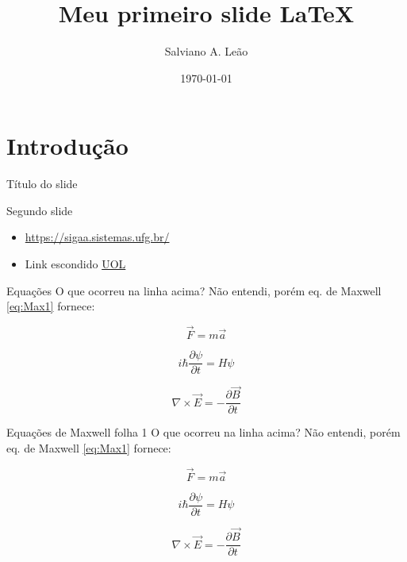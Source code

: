 \documentclass[style=sailor,clock,mode=present]{powerdot}
\title{Meu primeiro slide LaTeX}
\author{Salviano A. Leão}
\date{\today}
\begin{document}
\maketitle

\section{Introdução}

\begin{slide}{Título do slide}
\lipsum[1]
\end{slide}



\begin{slide}[toc=]{Segundo slide}
\begin{itemize}
   \item \url{https://sigaa.sistemas.ufg.br/}

   \item Link escondido \href{https://www.uol.com.br/}{UOL}
\end{itemize}

\end{slide}

\begin{slide}{Equações}
O que ocorreu na linha acima? Não entendi, porém 
eq. de Maxwell \ref{eq:Max1} fornece:

\begin{equation}\label{eq:2LN} 
 \vec{F} = m \vec{a}
\end{equation} 


\begin{equation}\label{eq:Sch} 
 i \hbar \frac{\partial \psi}{\partial t} = H \psi
\end{equation} 


\begin{equation}\label{eq:Max1} 
 \nabla \times \vec{E} = - \frac{\partial \vec{B}}{\partial t}
\end{equation} 

\end{slide}


\begin{slide}[toc=Maxwell, method=direct]{Equações de Maxwell folha 1}
O que ocorreu na linha acima? Não entendi, porém 
eq. de Maxwell \ref{eq:Max1} fornece:

\begin{equation}\label{eq:2LN} 
 \vec{F} = m \vec{a}
\end{equation} 


\begin{equation}\label{eq:Sch} 
 i \hbar \frac{\partial \psi}{\partial t} = H \psi
\end{equation} 


\begin{equation}\label{eq:Max1} 
 \nabla \times \vec{E} = - \frac{\partial \vec{B}}{\partial t}
\end{equation} 

\end{slide}
\end{document}
